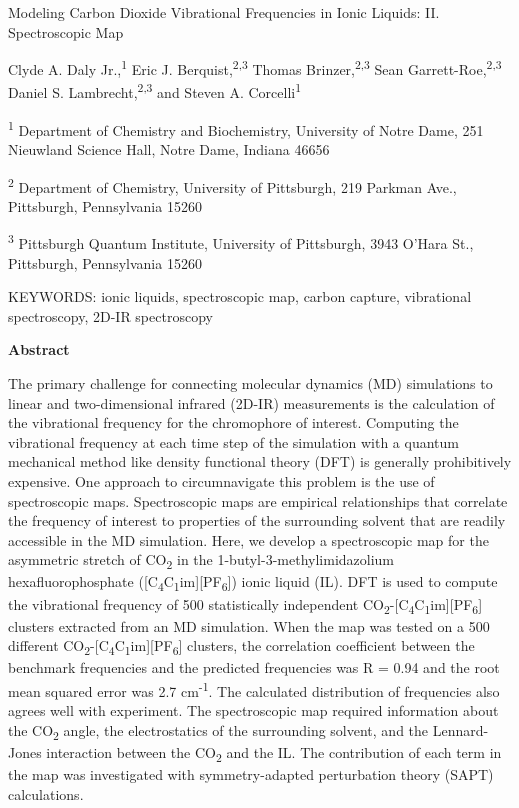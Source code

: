 \documentclass[]{article}
\date{}
\begin{document}
Modeling Carbon Dioxide Vibrational Frequencies in Ionic Liquids: II.
Spectroscopic Map

Clyde A. Daly Jr.,\textsuperscript{1} Eric J.
Berquist,\textsuperscript{2,3} Thomas Brinzer,\textsuperscript{2,3} Sean
Garrett-Roe,\textsuperscript{2,3} Daniel S.
Lambrecht,\textsuperscript{2,3} and Steven A.
Corcelli\textsuperscript{1}

\textsuperscript{1} Department of Chemistry and Biochemistry, University
of Notre Dame, 251 Nieuwland Science Hall, Notre Dame, Indiana 46656

\textsuperscript{2} Department of Chemistry, University of Pittsburgh,
219 Parkman Ave., Pittsburgh, Pennsylvania 15260

\textsuperscript{3} Pittsburgh Quantum Institute, University of
Pittsburgh, 3943 O'Hara St., Pittsburgh, Pennsylvania 15260

KEYWORDS: ionic liquids, spectroscopic map, carbon capture, vibrational
spectroscopy, 2D-IR spectroscopy

\textbf{Abstract}

The primary challenge for connecting molecular dynamics (MD) simulations
to linear and two-dimensional infrared (2D-IR) measurements is the
calculation of the vibrational frequency for the chromophore of
interest. Computing the vibrational frequency at each time step of the
simulation with a quantum mechanical method like density functional
theory (DFT) is generally prohibitively expensive. One approach to
circumnavigate this problem is the use of spectroscopic maps.
Spectroscopic maps are empirical relationships that correlate the
frequency of interest to properties of the surrounding solvent that are
readily accessible in the MD simulation. Here, we develop a
spectroscopic map for the asymmetric stretch of CO\textsubscript{2} in
the 1-butyl-3-methylimidazolium hexafluorophosphate
({[}C\textsubscript{4}C\textsubscript{1}im{]}{[}PF\textsubscript{6}{]})
ionic liquid (IL). DFT is used to compute the vibrational frequency of
500 statistically independent
CO\textsubscript{2}-{[}C\textsubscript{4}C\textsubscript{1}im{]}{[}PF\textsubscript{6}{]}
clusters extracted from an MD simulation. When the map was tested on a
500 different
CO\textsubscript{2}-{[}C\textsubscript{4}C\textsubscript{1}im{]}{[}PF\textsubscript{6}{]}
clusters, the correlation coefficient between the benchmark frequencies
and the predicted frequencies was R = 0.94 and the root mean squared
error was 2.7 cm\textsuperscript{-1}. The calculated distribution of
frequencies also agrees well with experiment. The spectroscopic map
required information about the CO\textsubscript{2} angle, the
electrostatics of the surrounding solvent, and the Lennard-Jones
interaction between the CO\textsubscript{2} and the IL. The contribution
of each term in the map was investigated with symmetry-adapted
perturbation theory (SAPT) calculations.
\end{document}
